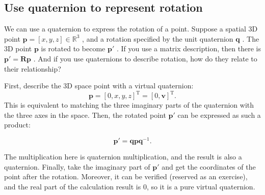 \subsection{Use quaternion to represent rotation}

We can use a quaternion to express the rotation of a point. Suppose a spatial 3D point $ \bm {p} = [x,y,z] \in  \mathbb {R}^ 3 $ , and a rotation specified by the unit quaternion $ \bm {q} $ . The 3D point $ \bm {p} $ is rotated to become $ \bm {p}' $ . If you use a matrix description, then there is $ \bm {p}'= \bm {R} \bm {p} $ . And if you use quaternions to describe rotation, how do they relate to their relationship?

First, describe the 3D space point with a virtual quaternion:
\[
\bm{p} = [0, x, y, z]^\mathrm{T} = [0, \bm{v}]^\mathrm{T}. 
\]
This is equivalent to matching the three imaginary parts of the quaternion with the three axes in the space. Then, the rotated point $ \bm {p}' $ can be expressed as such a product:

\begin{equation}\label{eq:rotate-with-quaternion}
\bm{p}' = \bm{q} \bm{p} \bm{q}^{-1}.
\end{equation}

The multiplication here is quaternion multiplication, and the result is also a quaternion. Finally, take the imaginary part of $ \bm{p}' $ and get the coordinates of the point after the rotation. Moreover, it can be verified (reserved as an exercise), and the real part of the calculation result is 0, so it is a pure virtual quaternion.
